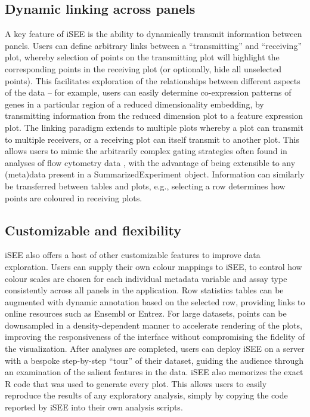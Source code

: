 \documentclass{bioinfo}
\begin{document}
\subsection{Dynamic linking across panels}
A key feature of iSEE is the ability to dynamically transmit information between panels. 
Users can define arbitrary links between a ``transmitting'' and ``receiving'' plot, whereby selection of points on the transmitting plot will highlight the corresponding points in the receiving plot (or optionally, hide all unselected points). 
This facilitates exploration of the relationships between different aspects of the data -- for example, users can easily determine co-expression patterns of genes in a particular region of a reduced dimensionality embedding, by transmitting information from the reduced dimension plot to a feature expression plot. 
The linking paradigm extends to multiple plots whereby a plot can transmit to multiple receivers, or a receiving plot can itself transmit to another plot.
This allows users to mimic the arbitrarily complex gating strategies often found in analyses of flow cytometry data \citep{finak2014opencyto}, with the advantage of being extensible to any (meta)data present in a SummarizedExperiment object. 
Information can similarly be transferred between tables and plots, e.g., selecting a row determines how points are coloured in receiving plots.

\subsection{Customizable and flexibility}
iSEE also offers a host of other customizable features to improve data exploration. 
Users can supply their own colour mappings to iSEE, to control how colour scales are chosen for each individual  metadata variable and assay type consistently across all panels in the application. 
Row statistics tables can be augmented with dynamic annotation based on the selected row, providing links to online resources such as Ensembl or Entrez. 
For large datasets, points can be downsampled in a density-dependent manner to accelerate rendering of the plots, improving the responsiveness of the interface without compromising the fidelity of the visualization. 
After analyses are completed, users can deploy iSEE on a server with a bespoke step-by-step ``tour'' of their dataset, guiding the audience through an examination of the salient features in the data.
iSEE also memorizes the exact R code that was used to generate every plot. 
This allows users to easily reproduce the results of any exploratory analysis, simply by copying the code reported by iSEE into their own analysis scripts. 
\end{document}
